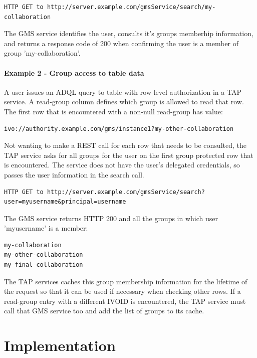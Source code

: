 \documentclass[11pt,a4paper]{ivoa}
\begin{document}
\begin{verbatim}
HTTP GET to http://server.example.com/gmsService/search/my-collaboration
\end{verbatim}

The GMS service identifies the user, consults it's groups memberhip information, and returns a response code of 200 when confirming the user is a member of group 'my-collaboration'.

\paragraph{Example 2 - Group access to table data}

A user issues an ADQL query to table with row-level authorization in a TAP service.  A read-group column defines which group is allowed to read that row.  The first row that is encountered with a non-null read-group has value:

\begin{verbatim}
ivo://authority.example.com/gms/instance1?my-other-collaboration
\end{verbatim}

Not wanting to make a REST call for each row that needs to be consulted, the TAP service asks for all groups for the user on the first group protected row that is encountered.  The service does not have the user's delegated credentials, so passes the user information in the search call.

\begin{verbatim}
HTTP GET to http://server.example.com/gmsService/search?user=myusername&principal=username
\end{verbatim}

The GMS service returns HTTP 200 and all the groups in which user 'myusername' is a member:

\begin{verbatim}
my-collaboration
my-other-collaboration
my-final-collaboration
\end{verbatim}

The TAP services caches this group membership information for the lifetime of the request so that it can be used if necessary when checking other rows.  If a read-group entry with a different IVOID is encountered, the TAP service must call that GMS service too and add the list of groups to its cache.

\section {Implementation}
\end{document}
